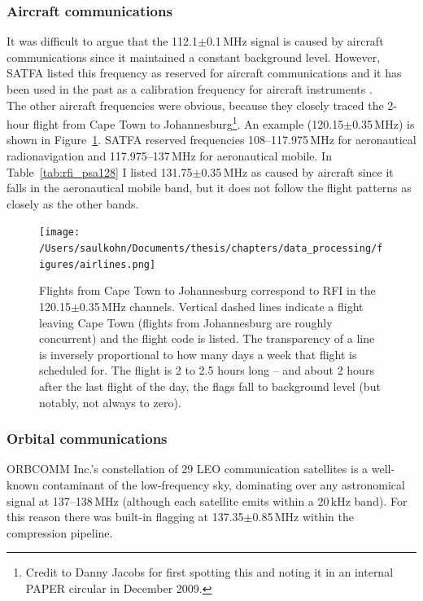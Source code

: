 \subsubsection*{Aircraft communications}
It was difficult to argue that the 112.1$\pm$0.1\,MHz signal is caused by aircraft communications since it maintained a constant background level. However, SATFA listed this frequency as reserved for aircraft communications and it has been used in the past as a calibration frequency for aircraft instruments \cite{AircraftCalibrationFreqs}.\\

The other aircraft frequencies were obvious, because they closely traced the 2-hour flight from Cape Town to Johannesburg\footnote{Credit to Danny Jacobs for first spotting this and noting it in an internal PAPER circular in December 2009.}. 
An example (120.15$\pm$0.35\,MHz) is shown in Figure~\ref{fig:rfi_psa128_aircraft}. SATFA reserved frequencies 108--117.975\,MHz for aeronautical radionavigation and 117.975--137\,MHz for aeronautical mobile. In Table~\ref{tab:rfi_psa128} I listed 131.75$\pm$0.35\,MHz as caused by aircraft since it falls in the aeronautical mobile band, but it does not follow the flight patterns as closely as the other bands.\\

\begin{figure}[h!]
\centering
\texttt{[image: /Users/saulkohn/Documents/thesis/chapters/data\_processing/figures/airlines.png]}
\caption[Flights from Cape Town to Johannesburg correspond to RFI in the 120.15$\pm$0.35\,MHz channels.]{
Flights from Cape Town to Johannesburg correspond to RFI in the 120.15$\pm$0.35\,MHz channels. Vertical dashed lines indicate a flight leaving Cape Town (flights from Johannesburg are roughly concurrent) and the flight code is listed. The transparency of a line is inversely proportional to how many days a week that flight is scheduled for. The flight is 2 to 2.5 hours long -- and about 2 hours after the last flight of the day, the flags fall to background level (but notably, not always to zero).}
\label{fig:rfi_psa128_aircraft}
\end{figure} 

\subsubsection*{Orbital communications}
ORBCOMM Inc.'s constellation of 29 LEO communication satellites is a well-known contaminant of the low-frequency sky, dominating over any astronomical signal at 137--138\,MHz (although each satellite emits within a 20\,kHz band). For this reason there was built-in flagging at 137.35$\pm$0.85\,MHz within the compression pipeline.


